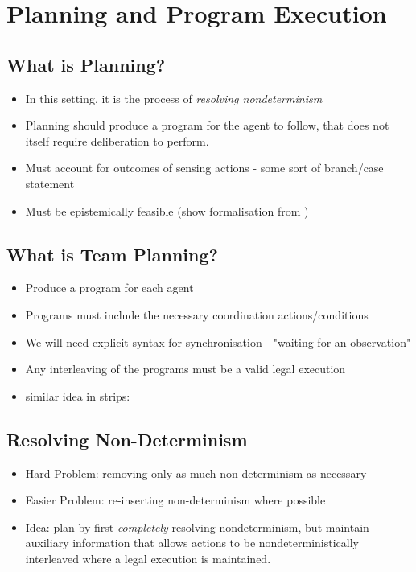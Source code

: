 \chapter{Planning and Program Execution}\label{ch:planning}

\section{What is Planning?}
\begin{itemize}
\item In this setting, it is the process of \emph{resolving nondeterminism}
\item Planning should produce a program for the agent to follow, that does
not itself require deliberation to perform. \cite{levesque96what_is_planning,giacomo04sem_delib_indigolog}
\item Must account for outcomes of sensing actions - some sort of branch/case statement
\item Must be epistemically feasible (show formalisation from \cite{giacomo04sem_delib_indigolog})
\end{itemize}

\section{What is Team Planning?}
\begin{itemize}
\item Produce a program for each agent
\item Programs must include the necessary coordination actions/conditions
\item We will need explicit syntax for synchronisation - "waiting for an observation"
\item Any interleaving of the programs must be a valid legal execution
\item similar idea in strips: \cite{boutilier01partialorder_conc}
\end{itemize}

\section{Resolving Non-Determinism}
\begin{itemize}
\item Hard Problem: removing only as much non-determinism as necessary
\item Easier Problem: re-inserting non-determinism where possible
\item Idea:  plan by first \emph{completely} resolving nondeterminism, but
maintain auxiliary information that allows actions to be nondeterministically 
interleaved where a legal execution is maintained.
\end{itemize}

